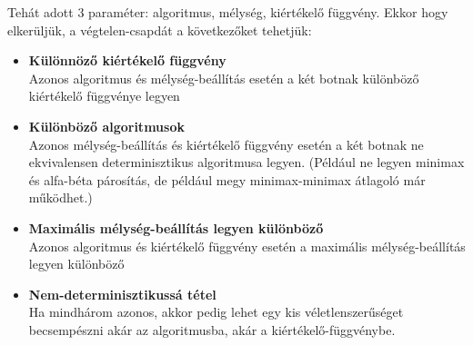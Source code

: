\documentclass[twoside, a4paper, 12pt]{article}
\renewcommand{\listoffigures}{\begingroup
\tocsection
\tocfile{\listfigurename}{lof}
\endgroup}
\renewcommand{\listoftables}{\begingroup
\tocsection
\tocfile{\listtablename}{lot}
\endgroup}
\begin{document}
Tehát adott 3 paraméter: algoritmus, mélység, kiértékelő függvény. Ekkor hogy elkerüljük, a végtelen-csapdát a következőket tehetjük:
\begin{itemize}
	\item \textbf{Különnöző kiértékelő függvény} \\ 
	Azonos algoritmus és mélység-beállítás esetén a két botnak különböző kiértékelő függvénye legyen
	
	\item \textbf{Különböző algoritmusok} \\
	Azonos mélység-beállítás és kiértékelő függvény esetén a két botnak ne ekvivalensen determinisztikus algoritmusa legyen. (Például ne legyen minimax és alfa-béta párosítás, de például megy minimax-minimax átlagoló már működhet.)
	
	\item \textbf{Maximális mélység-beállítás legyen különböző} \\
	Azonos algoritmus és kiértékelő függvény esetén a maximális mélység-beállítás legyen különböző
	
	\item \textbf{Nem-determinisztikussá tétel} \\
	Ha mindhárom azonos, akkor pedig lehet egy kis véletlenszerűséget becsempészni akár az algoritmusba, akár a kiértékelő-függvénybe.
\end{itemize}











































\newpage

\part{\bibname}

\listoffigures
\listoftables
\end{document}
